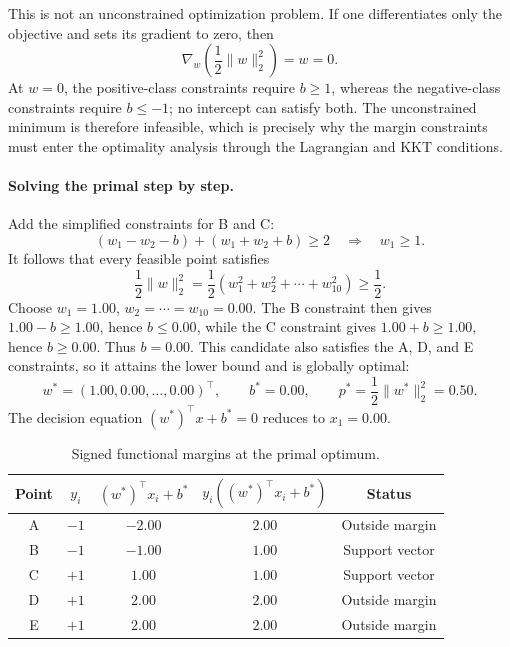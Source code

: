 \documentclass[11pt,a4paper]{article}
\numberwithin{equation}{section} %
\begin{document}
This is not an unconstrained optimization problem. If one differentiates
only the objective and sets its gradient to zero, then
\begin{equation}
    \nabla_w\left(\frac12\lVert w\rVert_2^2\right)=w=0.
\end{equation}
At $w=0$, the positive-class constraints require $b\geq1$, whereas the
negative-class constraints require $b\leq-1$; no intercept can satisfy both.
The unconstrained minimum is therefore infeasible, which is precisely why
the margin constraints must enter the optimality analysis through the
Lagrangian and KKT conditions.

\paragraph{Solving the primal step by step.}
Add the simplified constraints for B and C:
\begin{equation}
    (w_1-w_2-b)+(w_1+w_2+b)\geq2
    \quad\Longrightarrow\quad w_1\geq1.
\end{equation}
It follows that every feasible point satisfies
\begin{equation}
    \frac12\lVert w\rVert_2^2
    =\frac12(w_1^2+w_2^2+\cdots+w_{10}^2)
    \geq\frac12.
\end{equation}
Choose $w_1=1.00$, $w_2=\cdots=w_{10}=0.00$. The B constraint then gives
$1.00-b\geq1.00$, hence $b\leq0.00$, while the C constraint gives
$1.00+b\geq1.00$, hence $b\geq0.00$. Thus $b=0.00$. This candidate also satisfies
the A, D, and E constraints, so it attains the lower bound and is globally
optimal:
\begin{equation}
    w^*=(1.00,0.00,\ldots,0.00)^\top,\qquad b^*=0.00,
    \qquad p^*=\frac12\lVert w^*\rVert_2^2=0.50.
\end{equation}
The decision equation $(w^*)^\top x+b^*=0$ reduces to $x_1=0.00$.

\begin{table}[htbp]
\centering
\caption{Signed functional margins at the primal optimum.}
\label{tab:toy-margins}
\begin{tabular}{ccccc}
\toprule
Point & $y_i$ & $(w^*)^\top x_i+b^*$ & $y_i((w^*)^\top x_i+b^*)$ & Status \\
\midrule
A & $-1$ & $-2.00$ & $2.00$ & Outside margin \\
B & $-1$ & $-1.00$ & $1.00$ & Support vector \\
C & $+1$ & $1.00$ & $1.00$ & Support vector \\
D & $+1$ & $2.00$ & $2.00$ & Outside margin \\
E & $+1$ & $2.00$ & $2.00$ & Outside margin \\
\bottomrule
\end{tabular}
\end{table}
\end{document}
